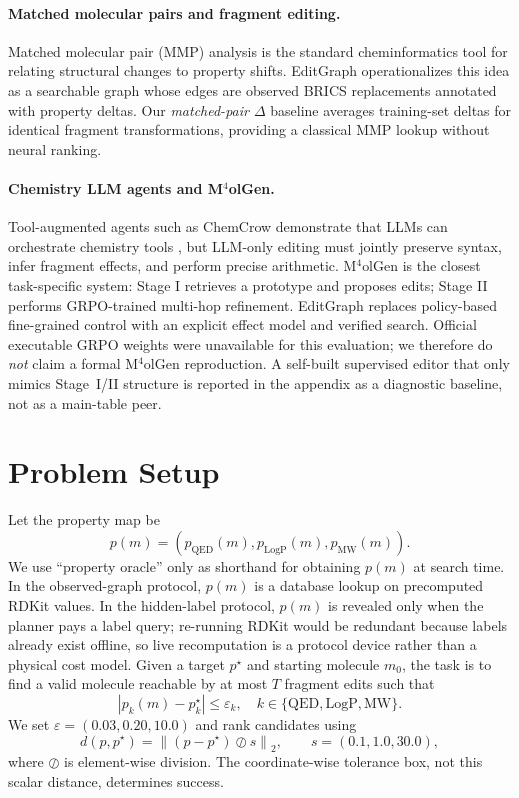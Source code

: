 \paragraph{Matched molecular pairs and fragment editing.}
Matched molecular pair (MMP) analysis is the standard cheminformatics tool for relating structural changes to property shifts. EditGraph operationalizes this idea as a searchable graph whose edges are observed BRICS replacements annotated with property deltas. Our \emph{matched-pair $\Delta$} baseline averages training-set deltas for identical fragment transformations, providing a classical MMP lookup without neural ranking.

\paragraph{Chemistry LLM agents and M$^4$olGen.}
Tool-augmented agents such as ChemCrow demonstrate that LLMs can orchestrate chemistry tools \citep{bran2024chemcrow}, but LLM-only editing must jointly preserve syntax, infer fragment effects, and perform precise arithmetic. M$^4$olGen \citep{li2026m4olgen} is the closest task-specific system: Stage I retrieves a prototype and proposes edits; Stage II performs GRPO-trained multi-hop refinement. EditGraph replaces policy-based fine-grained control with an explicit effect model and verified search. Official executable GRPO weights were unavailable for this evaluation; we therefore do \emph{not} claim a formal M$^4$olGen reproduction. A self-built supervised editor that only mimics Stage~I/II structure is reported in the appendix as a diagnostic baseline, not as a main-table peer.

\section{Problem Setup}
\label{sec:problem}

Let the property map be
\[
p(m)=\left(p_{\mathrm{QED}}(m),p_{\mathrm{LogP}}(m),p_{\mathrm{MW}}(m)\right).
\]
We use ``property oracle'' only as shorthand for obtaining $p(m)$ at search time. In the observed-graph protocol, $p(m)$ is a database lookup on precomputed RDKit values. In the hidden-label protocol, $p(m)$ is revealed only when the planner pays a label query; re-running RDKit would be redundant because labels already exist offline, so live recomputation is a protocol device rather than a physical cost model.
Given a target $p^\star$ and starting molecule $m_0$, the task is to find a valid molecule reachable by at most $T$ fragment edits such that
\[
|p_k(m)-p^\star_k|\leq\varepsilon_k,\quad
k\in\{\mathrm{QED},\mathrm{LogP},\mathrm{MW}\}.
\]
We set $\varepsilon=(0.03,0.20,10.0)$ and rank candidates using
\[
d(p,p^\star)=\left\|(p-p^\star)\oslash s\right\|_2,\qquad
s=(0.1,1.0,30.0),
\]
where $\oslash$ is element-wise division. The coordinate-wise tolerance box, not this scalar distance, determines success.

